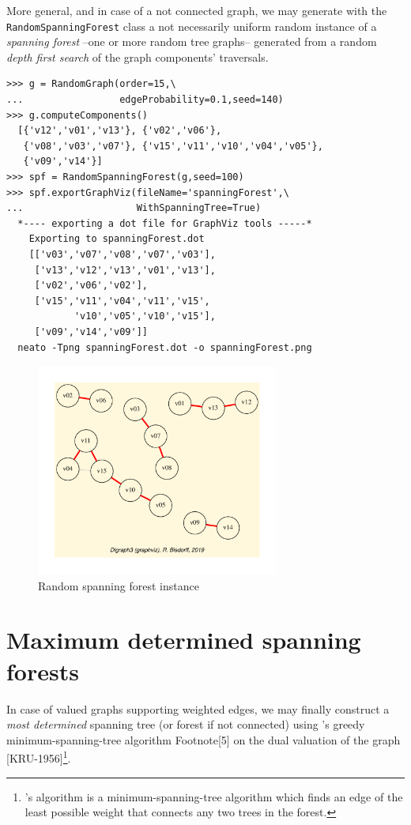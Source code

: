 More general, and in case of a not connected graph, we may generate with the \texttt{RandomSpanningForest} class a not necessarily uniform random instance of a \emph{spanning forest} --one or more random tree graphs-- generated from a random \emph{depth first search} of the graph components' traversals.
\begin{lstlisting}[caption={Computing spanning forests over disconnected graphs. },label=list:22.6]
>>> g = RandomGraph(order=15,\
...                 edgeProbability=0.1,seed=140)
>>> g.computeComponents()
  [{'v12','v01','v13'}, {'v02','v06'},
   {'v08','v03','v07'}, {'v15','v11','v10','v04','v05'},
   {'v09','v14'}]
>>> spf = RandomSpanningForest(g,seed=100)
>>> spf.exportGraphViz(fileName='spanningForest',\
...                    WithSpanningTree=True)
  *---- exporting a dot file for GraphViz tools -----*
    Exporting to spanningForest.dot
    [['v03','v07','v08','v07','v03'],
     ['v13','v12','v13','v01','v13'],
     ['v02','v06','v02'],
     ['v15','v11','v04','v11','v15',
            'v10','v05','v10','v15'],
     ['v09','v14','v09']]
  neato -Tpng spanningForest.dot -o spanningForest.png
\end{lstlisting}
\begin{figure}[h]
\sidecaption[t]
\includegraphics[width=8cm]{Figures/spanningForest.pdf}
\caption{Random spanning forest instance} 
\label{fig:22.6}       %
\end{figure}

\section{Maximum determined spanning forests}
\label{sec:22.3}

In case of valued graphs supporting weighted edges, we may finally construct a \emph{most determined} spanning tree (or forest if not connected) using \Kruskal's greedy minimum-spanning-tree algorithm Footnote[5] on the dual valuation of the graph [KRU-1956]\footnote{\Kruskal's algorithm is a minimum-spanning-tree algorithm which finds an edge of the least possible weight that connects any two trees in the forest.}.


